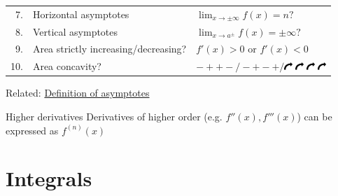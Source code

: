 \begin{table}[H]
\begin{tabular}{rll}
        7.  & Horizontal asymptotes                & $\lim_{x\to\pm\infty}f(x)=n?$                                                                                                                                                                                                                                                           \\
        8.  & Vertical asymptotes                  & $\lim_{x\to a^\pm}f(x)=\pm\infty?$                                                                                                                                                                                                                                                      \\
        9.  & Area strictly increasing/decreasing? & $f'(x)>0$ or $f'(x)<0$                                                                                                                                                                                                                                                                  \\
        10. & Area concavity?                      & $-++-/-+-+/$\includegraphics[width=0.3cm,origin=c, angle=270]{./img/arrow.png}  \includegraphics[width=0.3cm,origin=c, angle=180]{./img/arrow.png}  \includegraphics[width=0.3cm,origin=c, angle=90]{./img/arrow.png}  \includegraphics[width=0.3cm,origin=c, angle=0]{./img/arrow.png} \\
    \end{tabular}
\end{table}

Related: \hyperref[sec:asymptotes]{Definition of asymptotes}

\begin{knBox}
    {Higher derivatives}
    Derivatives of higher order (e.g. $f''(x), f'''(x)$) can be expressed as $f^{(n)}(x)$
\end{knBox}

\section{Integrals}

